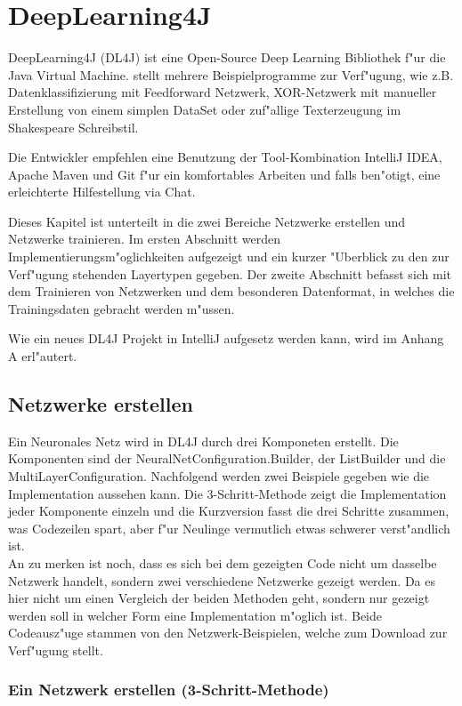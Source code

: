 \chapter{DeepLearning4J}
{
DeepLearning4J (DL4J) ist eine Open-Source Deep Learning Bibliothek f"ur die Java Virtual Machine. \cite{DL4J} stellt mehrere Beispielprogramme zur Verf"ugung, wie z.B. Datenklassifizierung mit Feedforward Netzwerk, XOR-Netzwerk mit manueller Erstellung von einem simplen DataSet oder zuf"allige Texterzeugung im Shakespeare Schreibstil.

Die Entwickler empfehlen eine Benutzung der Tool-Kombination IntelliJ IDEA, Apache Maven und Git f"ur ein komfortables Arbeiten und  falls ben"otigt, eine erleichterte Hilfestellung via Chat.

Dieses Kapitel ist unterteilt in die zwei Bereiche Netzwerke erstellen und Netzwerke trainieren. Im ersten Abschnitt werden Implementierungsm"oglichkeiten aufgezeigt und ein kurzer "Uberblick zu den zur Verf"ugung stehenden Layertypen gegeben. Der zweite Abschnitt befasst sich mit dem Trainieren von Netzwerken und dem besonderen Datenformat, in welches die Trainingsdaten gebracht werden m"ussen.

Wie ein neues DL4J Projekt in IntelliJ aufgesetz werden kann, wird im Anhang A erl"autert.


\section{Netzwerke erstellen}
Ein Neuronales Netz wird in DL4J durch drei Komponeten erstellt. Die Komponenten sind der NeuralNetConfiguration.Builder, der ListBuilder und die MultiLayerConfiguration. Nachfolgend werden zwei Beispiele gegeben wie die Implementation aussehen kann. Die 3-Schritt-Methode zeigt die Implementation jeder Komponente einzeln und die Kurzversion fasst die drei Schritte zusammen, was Codezeilen spart, aber f"ur Neulinge vermutlich etwas schwerer verst"andlich ist.\\
An zu merken ist noch, dass es sich bei dem gezeigten Code nicht um dasselbe Netzwerk handelt, sondern zwei verschiedene Netzwerke gezeigt werden. Da es hier nicht um einen Vergleich der beiden Methoden geht, sondern nur gezeigt werden soll in welcher Form eine Implementation m"oglich ist. Beide Codeausz"uge stammen von den Netzwerk-Beispielen, welche \cite{DL4J} zum Download zur Verf"ugung stellt.

\subsection{Ein Netzwerk erstellen (3-Schritt-Methode)}

}
